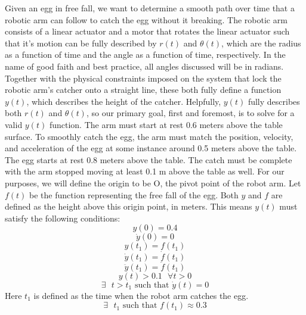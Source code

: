 \documentclass[nofoot,pdf-a,balance,colorlinks,upint,subscriptcorrection,varvw,mathalfa=cal=boondoxo]{asmeconf}
\begin{document}
    Given an egg in free fall, we want to determine a smooth path over time that a robotic arm can follow to catch the egg without it breaking. The robotic arm consists of a linear actuator and a motor that rotates the linear actuator such that it's motion can be fully described by $r\left(t\right)$ and $\theta\left(t\right)$, which are the radius as a function of time and the angle as a function of time, respectively. In the name of good faith and best practice, all angles discussed will be in radians. Together with the physical constraints imposed on the system that lock the robotic arm's catcher onto a straight line, these both fully define a function $y\left(t\right)$, which describes the height of the catcher. Helpfully, $y\left(t\right)$ fully describes both $r\left(t\right)$ and $\theta\left(t\right)$, so our primary goal, first and foremost, is to solve for a valid $y\left(t\right)$ function. The arm must start at rest 0.6 meters above the table surface. To smoothly catch the egg, the arm must match the position, velocity, and acceleration of the egg at some instance around 0.5 meters above the table. The egg starts at rest 0.8 meters above the table. The catch must be complete with the arm stopped moving at least 0.1 m above the table as well. \newline \newline 
    For our purposes, we will define the origin to be O, the pivot point of the robot arm. Let $f\left(t\right)$ be the function representing the free fall of the egg. Both $y$ and $f$ are defined as the height above this origin point, in meters. This means $y\left(t\right)$ must satisfy the following conditions:
    \begin{equation}
        y\left(0\right) = 0.4
    \end{equation}
    \begin{equation}
        \dot{y}\left(0\right) = 0
    \end{equation}
    \begin{equation}
        {y}\left(t_1\right) = f\left(t_1\right) 
    \end{equation}
    \begin{equation}
        \dot{y}\left(t_1\right) = \dot{f}\left(t_1\right)
    \end{equation}
    \begin{equation}
        \ddot{y}\left(t_1\right) = \ddot{f}\left(t_1\right)
    \end{equation}
    \begin{equation}
        {y}\left(t\right) > 0.1 \textrm{    } \forall t > 0
    \end{equation}
    \begin{equation}
        \exists \textrm{ }t > t_1 \textrm{      such that  }\dot{y}\left(t\right) = 0 
    \end{equation}
    Here $t_1$ is defined as the time when the robot arm catches the egg.
    \begin{equation}
        \exists\textrm{  } t_1 \textrm{      such that  } f(t_1) \approx 0.3
    \end{equation}
	
\end{document}
